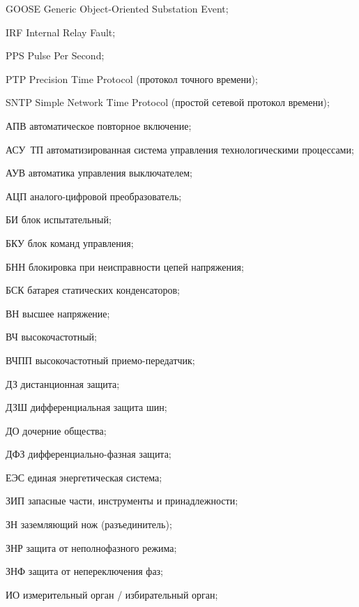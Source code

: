 \begin{list}{}%
{%
  \setlength{\labelwidth}{\abbrwidth}%
  \setlength{\labelsep}{0pt}%
  \setlength{\leftmargin}{\dimexpr\labelwidth+\labelsep\relax}%
  \setlength{\itemindent}{0pt}%
  \setlength{\parsep}{0pt}%
  \setlength{\itemsep}{0pt}
  \renewcommand{\makelabel}[1]{#1 --\hspace{\abbrgap}}%
}
\item[GOOSE] Generic Object-Oriented Substation Event;
\item[IRF] Internal Relay Fault;
\item[PPS] Pulse Per Second;
\item[PTP] Precision Time Protocol (протокол точного времени);
\item[SNTP] Simple Network Time Protocol (простой сетевой протокол времени);
\item[АПВ] автоматическое повторное включение;
\item[АСУ~ТП] автоматизированная система управления технологическими процессами;
\item[АУВ] автоматика управления выключателем;
\item[АЦП] аналого-цифровой преобразователь;
\item[БИ] блок испытательный;
\item[БКУ] блок команд управления;
\item[БНН] блокировка при неисправности цепей напряжения;
\item[БСК] батарея статических конденсаторов;
\item[ВН] высшее напряжение;
\item[ВЧ] высокочастотный;
\item[ВЧПП] высокочастотный приемо-передатчик;
\item[ДЗ] дистанционная защита;
\item[ДЗШ] дифференциальная защита шин;
\item[ДО] дочерние общества;
\item[ДФЗ] дифференциально-фазная защита;
\item[ЕЭС] единая энергетическая система;
\item[ЗИП] запасные части, инструменты и принадлежности;
\item[ЗН] заземляющий нож (разъединитель);
\item[ЗНР] защита от неполнофазного режима;
\item[ЗНФ] защита от непереключения фаз;
\item[ИО] измерительный орган / избирательный орган;

\end{list}
